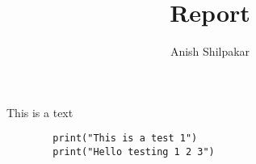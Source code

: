 \documentclass[12pt]{report}
\begin{document}
\title{Report}
\author{Anish Shilpakar}
\maketitle
This is a text 
\begin{verbatim}
        print("This is a test 1")
        print("Hello testing 1 2 3")
    \end{verbatim}
\end{document}
